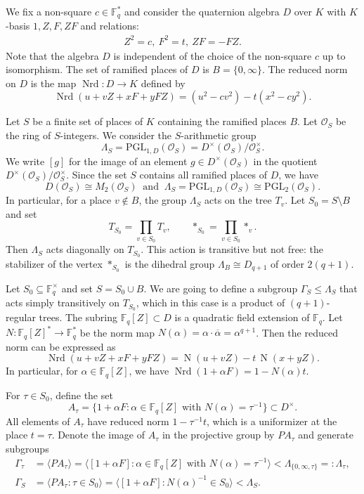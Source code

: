 \documentclass[12pt]{article}
\theoremstyle{definition}
\def\bF{{\mathbb F}}
\begin{document}
We fix a non-square $c\in\mathbb{F}_q^{*}$ and consider the quaternion algebra $D$ over $K$ with $K$-basis $1,Z,F,ZF$ and relations:
\begin{align*}
Z^2=c, \ F^2=t, \ ZF=-FZ.
\end{align*}
Note that the algebra $D$ is independent of the choice of the non-square $c$ up to isomorphism. The set of ramified places of $D$ is $B=\{0,\infty\}$. The reduced norm on $D$ is the map $\operatorname{Nrd}: D \to K$ defined by
\[
\operatorname{Nrd}(u+vZ + xF + yFZ)=
(u^2 - c v^2) - t(x^2 - c y^2).
\]

Let $S$ be a finite set of places of $K$ containing the ramified places $B$. Let $\mathcal{O}_S$ be the ring of $S$-integers. We consider the $S$-arithmetic group
\[
\Lambda_S
= \mathrm{PGL}_{1,D}(\mathcal{O}_{S})
= D^{\times}(\mathcal{O}_{S}) / \mathcal{O}_{S}^{\times}.
\]
We write \([g]\) for the image of an element \(g \in D^{\times}(\mathcal{O}_{S})\) in the quotient \(D^{\times}(\mathcal{O}_{S}) / \mathcal{O}_{S}^{\times}\). Since the set \(S\) contains all ramified places of \(D\), we have
\[
D(\mathcal{O}_{S}) \cong M_2(\mathcal{O}_{S}) \ \mbox{ and } \
\Lambda_S
= \mathrm{PGL}_{1,D}(\mathcal{O}_{S})
\cong \mathrm{PGL}_2(\mathcal{O}_{S}).
\]
In particular, for a place $v\not\in B$, the group $\Lambda_S$ acts on the tree $T_v$. Let \(S_0 = S \setminus B\) and set
\[
T_{S_0} = \prod_{v\in S_0} T_v, \qquad *_{S_0}=\prod_{v\in S_0} *_v.
\]
Then \(\Lambda_S\) acts diagonally on \(T_{S_0}\). This action is transitive but not free: the stabilizer of the vertex $*_{S_0}$ is the dihedral group $\Lambda_B\cong D_{q+1}$ of order $2(q+1)$.

Let $S_0\subseteq \bF_q^{\times}$ and set $S=S_0\cup B$. We are going to define a subgroup $\Gamma_S \leq \Lambda_S$ that acts simply transitively on \(T_{S_0}\), which in this case is a product of $(q+1)$-regular trees.
The subring $\bF_q[Z]\subset D$ is a quadratic field extension of $\bF_q$. Let $N:\bF_q[Z]^{*}\rightarrow\bF_q^{*}$ be the norm map $N(\alpha)=\alpha\cdot\overline{\alpha}=\alpha^{q+1}$. Then the reduced norm can be expressed as
\[
\operatorname{Nrd}(u+vZ + xF + yFZ)=\operatorname{N}(u+vZ)-t\,\operatorname{N}(x+yZ).
\]
In particular, for $\alpha\in \bF_q[Z]$, we have $\operatorname{Nrd}(1+\alpha F)=1-N(\alpha)t$.

For $\tau\in S_0$, define the set
\[
A_\tau=\{ 1+\alpha F : \alpha\in\bF_q[Z] \mbox{ with $N(\alpha)=\tau^{-1}$} \}\subset D^{\times}.
\]
All elements of $A_\tau$ have reduced norm $1-\tau^{-1}t$, which is a uniformizer at the place $t=\tau$. Denote the image of $A_\tau$ in the projective group by $PA_\tau$ and generate subgroups
\begin{align*}
\Gamma_\tau&=\langle PA_\tau \rangle = \langle [1+\alpha F] : \alpha\in\bF_q[Z] \mbox{ with $N(\alpha)=\tau^{-1}$} \rangle  < \Lambda_{\{0,\infty,\tau\}}=:\Lambda_\tau,\\
\Gamma_S &= \langle PA_\tau : \tau\in S_0\rangle = \langle [1+\alpha F] : N(\alpha)^{-1}\in S_0\rangle<\Lambda_S.
\end{align*}
\end{document}
